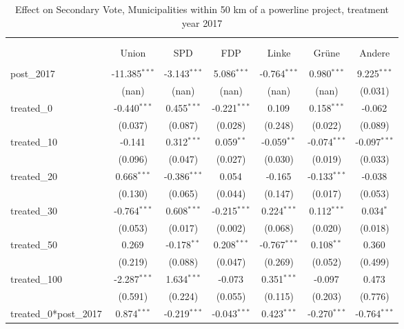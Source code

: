\begin{table}[!htbp] \centering
  \caption{Effect on Secondary Vote, Municipalities within 50 km of a powerline project, treatment year 2017}
\begin{tabular}{@{\extracolsep{5pt}}lcccccc}
\\[-1.8ex]\hline
\hline \\[-1.8ex]
\\[-1.8ex] & \multicolumn{1}{c}{Union} & \multicolumn{1}{c}{SPD} & \multicolumn{1}{c}{FDP} & \multicolumn{1}{c}{Linke} & \multicolumn{1}{c}{Grüne} & \multicolumn{1}{c}{Andere}  \\
\hline \\[-1.8ex]
 post_2017 & -11.385$^{***}$ & -3.143$^{***}$ & 5.086$^{***}$ & -0.764$^{***}$ & 0.980$^{***}$ & 9.225$^{***}$ \\
  & (nan) & (nan) & (nan) & (nan) & (nan) & (0.031) \\
 treated_0 & -0.440$^{***}$ & 0.455$^{***}$ & -0.221$^{***}$ & 0.109$^{}$ & 0.158$^{***}$ & -0.062$^{}$ \\
  & (0.037) & (0.087) & (0.028) & (0.248) & (0.022) & (0.089) \\
 treated_10 & -0.141$^{}$ & 0.312$^{***}$ & 0.059$^{**}$ & -0.059$^{**}$ & -0.074$^{***}$ & -0.097$^{***}$ \\
  & (0.096) & (0.047) & (0.027) & (0.030) & (0.019) & (0.033) \\
 treated_20 & 0.668$^{***}$ & -0.386$^{***}$ & 0.054$^{}$ & -0.165$^{}$ & -0.133$^{***}$ & -0.038$^{}$ \\
  & (0.130) & (0.065) & (0.044) & (0.147) & (0.017) & (0.053) \\
 treated_30 & -0.764$^{***}$ & 0.608$^{***}$ & -0.215$^{***}$ & 0.224$^{***}$ & 0.112$^{***}$ & 0.034$^{*}$ \\
  & (0.053) & (0.017) & (0.002) & (0.068) & (0.020) & (0.018) \\
 treated_50 & 0.269$^{}$ & -0.178$^{**}$ & 0.208$^{***}$ & -0.767$^{***}$ & 0.108$^{**}$ & 0.360$^{}$ \\
  & (0.219) & (0.088) & (0.047) & (0.269) & (0.052) & (0.499) \\
 treated_100 & -2.287$^{***}$ & 1.634$^{***}$ & -0.073$^{}$ & 0.351$^{***}$ & -0.097$^{}$ & 0.473$^{}$ \\
  & (0.591) & (0.224) & (0.055) & (0.115) & (0.203) & (0.776) \\
 treated_0*post_2017 & 0.874$^{***}$ & -0.219$^{***}$ & -0.043$^{***}$ & 0.423$^{***}$ & -0.270$^{***}$ & -0.764$^{***}$ \\

\end{tabular}
\end{table}
